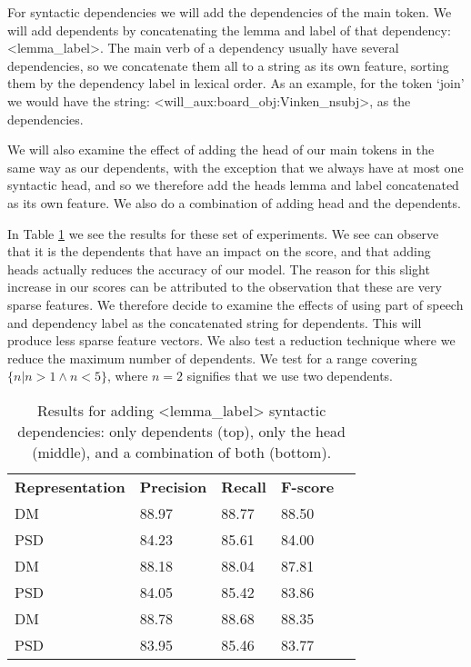 For syntactic dependencies we will add the dependencies of the main token. We will add dependents by concatenating the lemma and label of that dependency: <lemma\_label>. The main verb of a dependency usually have several dependencies, so we concatenate them all to a string as its own feature, sorting them by the dependency label in lexical order. As an example, for the token `join' we would have the string: <will\_aux:board\_obj:Vinken\_nsubj>, as the dependencies.

We will also examine the effect of adding the head of our main tokens in the same way as our dependents, with the exception that we always have at most one syntactic head, and so we therefore add the heads lemma and label concatenated as its own feature. We also do a combination of adding head and the dependents.

In Table \ref{table:dependents_head} we see the results for these set of experiments. We see can observe that it is the dependents that have an impact on the score, and that adding heads actually reduces the accuracy of our model. The reason for this slight increase in our scores can be attributed to the observation that these are very sparse features. We therefore decide to examine the effects of using part of speech and dependency label as the concatenated string for dependents. This will produce less sparse feature vectors. We also test a reduction technique where we reduce the maximum number of dependents. We test for a range covering ${\{n|n>1 \wedge n<5\}}$, where $n=2$ signifies that we use two dependents.

\begin{table}
    \centering
    \smaller[0.2]
    \begin{tabular}{@{}lllll@{}}
        \toprule
        \textbf{Representation} & \textbf{Precision} & \textbf{Recall} & \textbf{F-score} \\
        DM &  88.97 & 88.77 & 88.50 \\
        PSD & 84.23 & 85.61 & 84.00 \\
        \midrule
        DM &  88.18 & 88.04 & 87.81 \\
        PSD & 84.05 & 85.42 & 83.86 \\
        \midrule
        DM &  88.78 & 88.68 & 88.35 \\
        PSD & 83.95 & 85.46 & 83.77 \\
        \bottomrule
    \end{tabular}
    \caption{Results for adding <lemma\_label> syntactic dependencies: only dependents (top), only the head (middle), and a combination of both (bottom).}
    \label{table:dependents_head}
\end{table}

